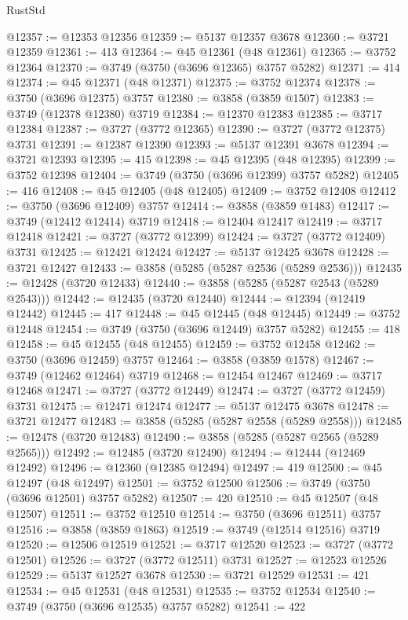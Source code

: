 \begin{lexlean}{RustStd}
\begin{coremodule}
@12357 := @12353 @12356
@12359 := @5137 @12357 @3678
@12360 := @3721 @12359
@12361 := 413
@12364 := @45 @12361 (@48 @12361)
@12365 := @3752 @12364
@12370 := @3749 (@3750 (@3696 @12365) @3757 @5282)
@12371 := 414
@12374 := @45 @12371 (@48 @12371)
@12375 := @3752 @12374
@12378 := @3750 (@3696 @12375) @3757
@12380 := @3858 (@3859 @1507)
@12383 := @3749 (@12378 @12380) @3719
@12384 := @12370 @12383
@12385 := @3717 @12384
@12387 := @3727 (@3772 @12365)
@12390 := @3727 (@3772 @12375) @3731
@12391 := @12387 @12390
@12393 := @5137 @12391 @3678
@12394 := @3721 @12393
@12395 := 415
@12398 := @45 @12395 (@48 @12395)
@12399 := @3752 @12398
@12404 := @3749 (@3750 (@3696 @12399) @3757 @5282)
@12405 := 416
@12408 := @45 @12405 (@48 @12405)
@12409 := @3752 @12408
@12412 := @3750 (@3696 @12409) @3757
@12414 := @3858 (@3859 @1483)
@12417 := @3749 (@12412 @12414) @3719
@12418 := @12404 @12417
@12419 := @3717 @12418
@12421 := @3727 (@3772 @12399)
@12424 := @3727 (@3772 @12409) @3731
@12425 := @12421 @12424
@12427 := @5137 @12425 @3678
@12428 := @3721 @12427
@12433 := @3858 (@5285 (@5287 @2536 (@5289 @2536)))
@12435 := @12428 (@3720 @12433)
@12440 := @3858 (@5285 (@5287 @2543 (@5289 @2543)))
@12442 := @12435 (@3720 @12440)
@12444 := @12394 (@12419 @12442)
@12445 := 417
@12448 := @45 @12445 (@48 @12445)
@12449 := @3752 @12448
@12454 := @3749 (@3750 (@3696 @12449) @3757 @5282)
@12455 := 418
@12458 := @45 @12455 (@48 @12455)
@12459 := @3752 @12458
@12462 := @3750 (@3696 @12459) @3757
@12464 := @3858 (@3859 @1578)
@12467 := @3749 (@12462 @12464) @3719
@12468 := @12454 @12467
@12469 := @3717 @12468
@12471 := @3727 (@3772 @12449)
@12474 := @3727 (@3772 @12459) @3731
@12475 := @12471 @12474
@12477 := @5137 @12475 @3678
@12478 := @3721 @12477
@12483 := @3858 (@5285 (@5287 @2558 (@5289 @2558)))
@12485 := @12478 (@3720 @12483)
@12490 := @3858 (@5285 (@5287 @2565 (@5289 @2565)))
@12492 := @12485 (@3720 @12490)
@12494 := @12444 (@12469 @12492)
@12496 := @12360 (@12385 @12494)
@12497 := 419
@12500 := @45 @12497 (@48 @12497)
@12501 := @3752 @12500
@12506 := @3749 (@3750 (@3696 @12501) @3757 @5282)
@12507 := 420
@12510 := @45 @12507 (@48 @12507)
@12511 := @3752 @12510
@12514 := @3750 (@3696 @12511) @3757
@12516 := @3858 (@3859 @1863)
@12519 := @3749 (@12514 @12516) @3719
@12520 := @12506 @12519
@12521 := @3717 @12520
@12523 := @3727 (@3772 @12501)
@12526 := @3727 (@3772 @12511) @3731
@12527 := @12523 @12526
@12529 := @5137 @12527 @3678
@12530 := @3721 @12529
@12531 := 421
@12534 := @45 @12531 (@48 @12531)
@12535 := @3752 @12534
@12540 := @3749 (@3750 (@3696 @12535) @3757 @5282)
@12541 := 422

\end{coremodule}
\end{lexlean}
